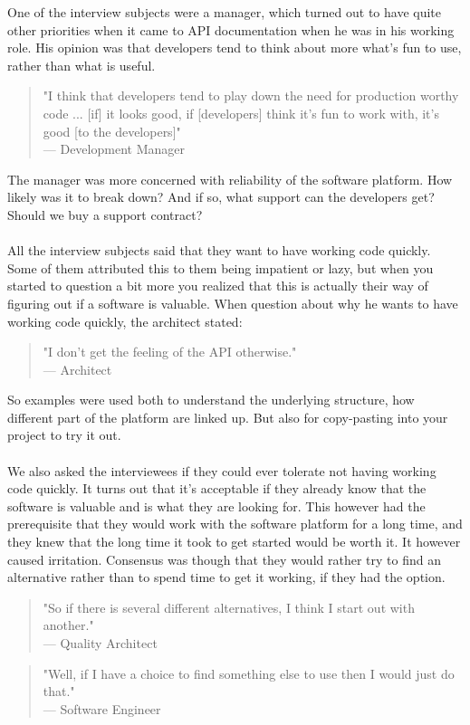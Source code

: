 \documentclass{article}
\begin{document}
One of the interview subjects were a manager, which turned out to have quite other priorities when it came to API documentation when he was in his working role. His opinion was that developers tend to think about more what's fun to use, rather than what is useful.
\begin{quote}
"I think that developers tend to play down the need for production worthy code ... [if] it looks good, if [developers] think it's fun to work with, it's good [to the developers]" \\
--- Development Manager
\end{quote}
The manager was more concerned with reliability of the software platform. How likely was it to break down? And if so, what support can the developers get? Should we buy a support contract?
\\ \\
All the interview subjects said that they want to have working code quickly. Some of them attributed this to them being impatient or lazy, but when you started to question a bit more you realized that this is actually their way of figuring out if a software is valuable. When question about why he wants to have working code quickly, the architect stated:
\begin{quote}
"I don't get the feeling of the API otherwise." \\
--- Architect
\end{quote}
So examples were used both to understand the underlying structure, how different part of the platform are linked up. But also for copy-pasting into your project to try it out.
\\ \\
We also asked the interviewees if they could ever tolerate not having working code quickly. It turns out that it's acceptable if they already know that the software is valuable and is what they are looking for. This however had the prerequisite that they would work with the software platform for a long time, and they knew that the long time it took to get started would be worth it. It however caused irritation. Consensus was though that they would rather try to find an alternative rather than to spend time to get it working, if they had the option.
\begin{quote}
"So if there is several different alternatives, I think I start out with another."\\
--- Quality Architect
\end{quote}
\begin{quote}
"Well, if I have a choice to find something else to use then I would just do that." \\
--- Software Engineer
\end{quote}
\end{document}
